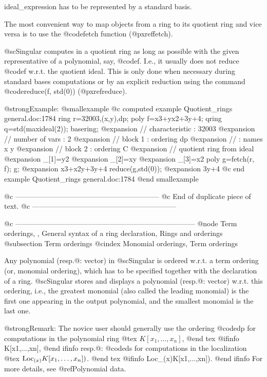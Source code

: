 ideal_expression has to be represented by a standard basis.

The most convenient way to map objects from a ring to its quotient ring
and vice versa is to use the @code{fetch} function (@pxref{fetch}).

@sc{Singular} computes in a quotient ring as long as possible with the
given representative of a polynomial, say, @code{f}.  I.e., it usually
does not reduce @code{f} w.r.t. the quotient ideal.  This is only done
when necessary
during standard bases computations or by an explicit reduction using
the command @code{reduce(f, std(0))} (@pxref{reduce}).

@strong{Example:}
@smallexample
@c computed example Quotient_rings general.doc:1784 
  ring r=32003,(x,y),dp;
  poly f=x3+yx2+3y+4;
  qring q=std(maxideal(2));
  basering;
@expansion{} //   characteristic : 32003
@expansion{} //   number of vars : 2
@expansion{} //        block   1 : ordering dp
@expansion{} //                  : names    x y 
@expansion{} //        block   2 : ordering C
@expansion{} // quotient ring from ideal
@expansion{} _[1]=y2
@expansion{} _[2]=xy
@expansion{} _[3]=x2
  poly g=fetch(r, f);
  g;
@expansion{} x3+x2y+3y+4
  reduce(g,std(0));
@expansion{} 3y+4
@c end example Quotient_rings general.doc:1784
@end smallexample

@c ------------------------------------------------------------
@c   End of duplicate piece of text.
@c ------------------------------------------------------------

@c ---------------------------------------------------------------------------
@node Term orderings,  , General syntax of a ring declaration, Rings and orderings
@subsection Term orderings
@cindex Monomial orderings, Term orderings

Any polynomial (resp.@: vector) in @sc{Singular} is ordered w.r.t. a
term ordering (or, monomial ordering), which has to be specified
together with the declaration of a ring. @sc{Singular} stores and
displays a polynomial (resp.@: vector) w.r.t. this ordering, i.e., the
greatest monomial (also called the leading monomial) is the first one
appearing in the output polynomial, and the smallest monomial is the last one.

@strong{Remark:} The novice user should generally use the ordering
@code{dp} for computations in the polynomial ring
@tex
$K[x_1,\ldots,x_n]$,
@end tex
@ifinfo
K[x1,...,xn],
@end ifinfo
resp.@:  @code{ds} for computations in the localization
@tex
$\hbox{Loc}_{(x)}K[x_1,\ldots,x_n])$.
@end tex
@ifinfo
Loc_(x)K[x1,...,xn]).
@end ifinfo
For more details, see @ref{Polynomial data}.

